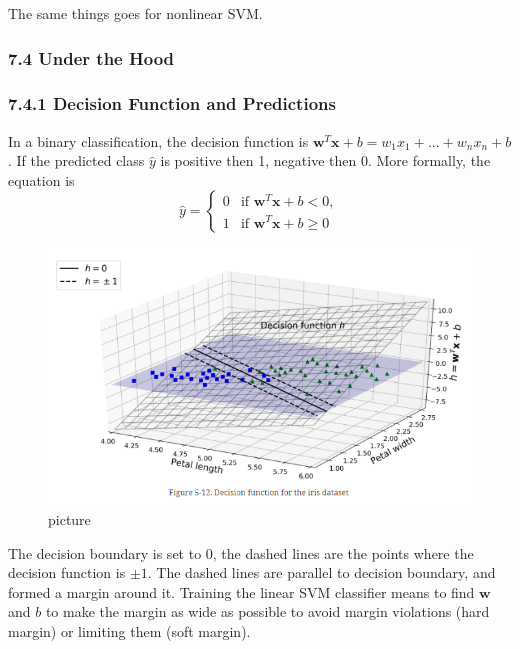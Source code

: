 \documentclass[
  letterpaper,
  DIV=11,
  numbers=noendperiod]{scrartcl}
\begin{document}
The same things goes for nonlinear SVM.

\subsubsection{7.4 Under the Hood}\label{under-the-hood}

\subsubsection{7.4.1 Decision Function and
Predictions}\label{decision-function-and-predictions}

In a binary classification, the decision function is
\(\mathbf{w}^T\mathbf{x} + b = w_1x_1 + ... + w_nx_n + b\). If the
predicted class \(\hat{y}\) is positive then 1, negative then 0. More
formally, the equation is \[
\hat{y} = \begin{cases}
    0 & \text{if } \mathbf{w}^T \mathbf{x} + b < 0, \\
    1 & \text{if } \mathbf{w}^T \mathbf{x} + b \geq 0
\end{cases}
\]

\begin{figure}[H]

{\centering \includegraphics{7.png}

}

\caption{picture}

\end{figure}%

The decision boundary is set to 0, the dashed lines are the points where
the decision function is \(\pm 1\). The dashed lines are parallel to
decision boundary, and formed a margin around it. Training the linear
SVM classifier means to find \(\mathbf{w}\) and \(b\) to make the margin
as wide as possible to avoid margin violations (hard margin) or limiting
them (soft margin).
\end{document}

